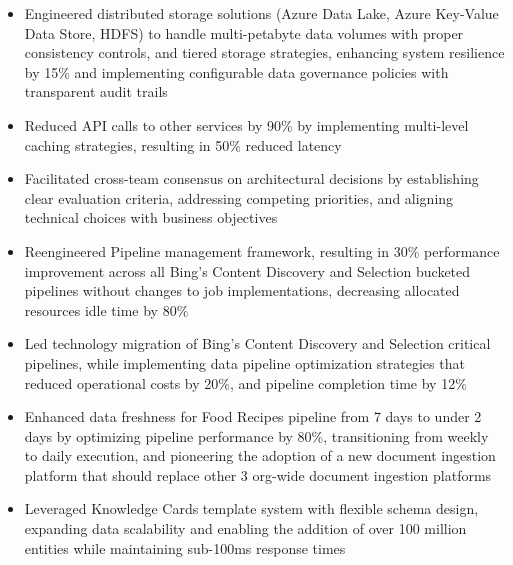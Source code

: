 \begin{itemize}
    \item \small{Engineered distributed storage solutions (Azure Data Lake, Azure Key-Value Data Store, HDFS) to handle multi-petabyte data volumes with proper consistency controls, and tiered storage strategies, enhancing system resilience by 15\% and implementing configurable data governance policies with transparent audit trails}

    \item \small{Reduced API calls to other services by 90\% by implementing multi-level caching strategies, resulting in 50\% reduced latency}

    \item \small{Facilitated cross-team consensus on architectural decisions by establishing clear evaluation criteria, addressing competing priorities, and aligning technical choices with business objectives}

    \item \small{Reengineered Pipeline management framework, resulting in 30\% performance improvement across all Bing's Content Discovery and Selection bucketed pipelines without changes to job implementations, decreasing allocated resources idle time by 80\%}

    \item \small{Led technology migration of Bing's Content Discovery and Selection critical pipelines, while implementing data pipeline optimization strategies that reduced operational costs by 20\%, and pipeline completion time by 12\%}

    \item \small{Enhanced data freshness for Food Recipes pipeline from 7 days to under 2 days by optimizing pipeline performance by 80\%, transitioning from weekly to daily execution, and pioneering the adoption of a new document ingestion platform that should replace other 3 org-wide document ingestion platforms}

    \item \small{Leveraged Knowledge Cards template system with flexible schema design, expanding data scalability and enabling the addition of over 100 million entities while maintaining sub-100ms response times}




\end{itemize}
